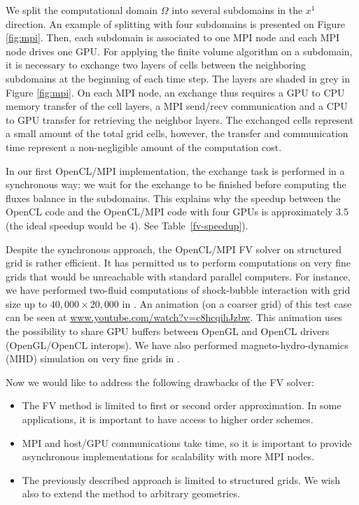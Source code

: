 \documentclass[12pt]{amsart}
\begin{document}
We split the computational domain $\Omega$ into several subdomains in the $x^1$ direction. An example of splitting with four subdomains is presented on Figure \ref{fig:mpi}.
Then, each subdomain is associated to one MPI node and each MPI node drives one GPU. For applying the finite volume algorithm on a subdomain, it is necessary to exchange two layers of cells between the neighboring subdomains at the beginning of each time step. The layers are shaded in grey in Figure \ref{fig:mpi}. On each MPI node, an exchange thus requires a GPU to CPU memory transfer of the cell layers, a MPI send/recv communication and a CPU to GPU transfer for retrieving the neighbor layers. The exchanged cells represent a small amount of the total grid cells, however, the transfer and communication time represent a non-negligible amount of the computation cost.

In our first OpenCL/MPI implementation, the exchange task is performed in a synchronous way: we wait for the exchange to be finished before computing the fluxes balance in the subdomains.  This explains why the speedup between the OpenCL code and the OpenCL/MPI code with four GPUs is approximately 3.5 (the ideal speedup would be 4). See Table~\ref{fv-speedup}).

Despite the synchronous approach, the OpenCL/MPI FV solver on structured grid is rather efficient. It has permitted us to perform computations on very fine grids that would be unreachable with standard parallel computers. For instance, we have performed two-fluid computations of shock-bubble interaction with grid size  up to $40,000\times 20,000$  in \cite{helluy2014interpolated}. An animation (on a coarser grid) of this test case can be seen at \href{https://www.youtube.com/watch?v=c8hcqihJzbw}{\url{www.youtube.com/watch?v=c8hcqihJzbw}}. This animation uses the possibility to share GPU buffers between OpenGL and OpenCL drivers (OpenGL/OpenCL interops). We have also performed magneto-hydro-dynamics (MHD) simulation on very fine grids in \cite{massaro2014numerical}.

Now we would like to address the following drawbacks of the FV solver:
\begin{itemize}
\item The FV method is limited to first or second order approximation. In some applications, it is important to have access to higher order schemes.
\item MPI and host/GPU communications take time, so it is important to provide asynchronous implementations for scalability with more MPI nodes.
\item The previously described approach is limited to structured grids. We wish also to extend the method to arbitrary geometries.
\end{itemize}
\end{document}
